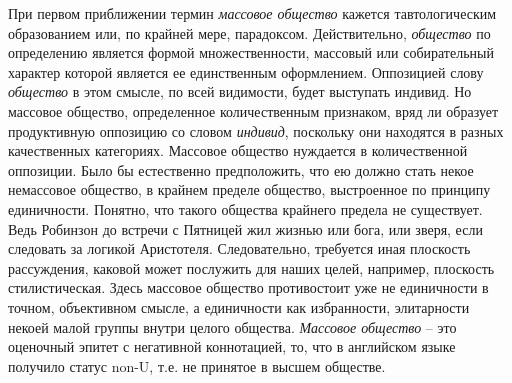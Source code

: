 При первом приближении термин \emph{массовое общество} кажется тавтологическим
образованием или, по крайней мере, парадоксом. Действительно, \emph{общество} по
определению является формой множественности, массовый или собирательный характер
которой является ее единственным оформлением. Оппозицией слову \emph{общество} в этом смысле,
по всей видимости, будет выступать индивид. Но массовое общество, определенное
количественным признаком, вряд ли образует продуктивную оппозицию со словом \emph{индивид},
поскольку они находятся в разных качественных категориях. Массовое общество нуждается в
количественной оппозиции. Было бы естественно предположить, что ею должно стать
некое немассовое общество, в крайнем пределе общество, выстроенное по принципу единичности.
Понятно, что такого общества крайнего предела не существует. Ведь Робинзон до встречи с
Пятницей жил жизнью или бога, или зверя, если следовать за логикой Аристотеля.
Следовательно, требуется иная плоскость рассуждения, каковой может послужить для наших целей,
например, плоскость стилистическая. Здесь массовое общество противостоит уже не единичности в
точном, объективном смысле, а единичности как избранности, элитарности некоей малой
группы внутри целого общества. \emph{Массовое общество} -- это оценочный эпитет с
негативной коннотацией, то, что в английском языке получило статус non-U, т.е.
не принятое в высшем обществе. \autocite{english_aristocracy}

